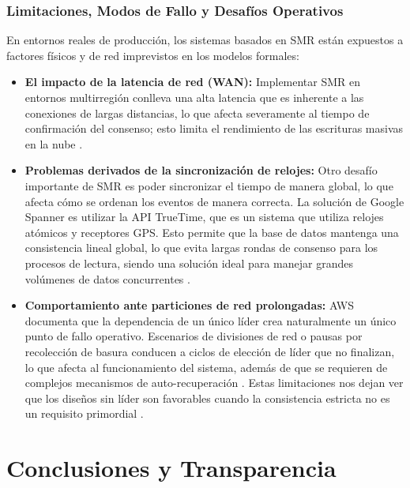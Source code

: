\documentclass[12pt,letterpaper]{article}
\begin{document}
\subsubsection{Limitaciones, Modos de Fallo y Desafíos Operativos}
En entornos reales de producción, los sistemas basados en SMR están expuestos a factores físicos y de red imprevistos en los modelos formales:
\begin{itemize}
    \item \textbf{El impacto de la latencia de red (WAN):} Implementar SMR en entornos multirregión conlleva una alta latencia que es inherente a las conexiones de largas distancias, lo que afecta severamente al tiempo de confirmación del consenso; esto limita el rendimiento de las escrituras masivas en la nube \cite{liang2025}.
    
    \item \textbf{Problemas derivados de la sincronización de relojes:} Otro desafío importante de SMR es poder sincronizar el tiempo de manera global, lo que afecta cómo se ordenan los eventos de manera correcta. La solución de Google Spanner es utilizar la API TrueTime, que es un sistema que utiliza relojes atómicos y receptores GPS. Esto permite que la base de datos mantenga una consistencia lineal global, lo que evita largas rondas de consenso para los procesos de lectura, siendo una solución ideal para manejar grandes volúmenes de datos concurrentes \cite{srivastava2023, maiyya2021}.
    
    \item \textbf{Comportamiento ante particiones de red prolongadas:} AWS documenta que la dependencia de un único líder crea naturalmente un único punto de fallo operativo. Escenarios de divisiones de red o pausas por recolección de basura conducen a ciclos de elección de líder que no finalizan, lo que afecta al funcionamiento del sistema, además de que se requieren de complejos mecanismos de auto-recuperación \cite{kondru2026}. Estas limitaciones nos dejan ver que los diseños sin líder son favorables cuando la consistencia estricta no es un requisito primordial \cite{brooker2020}. 
\end{itemize}


\section{Conclusiones y Transparencia}
\label{sec:conclusiones_transparencia}
\end{document}
